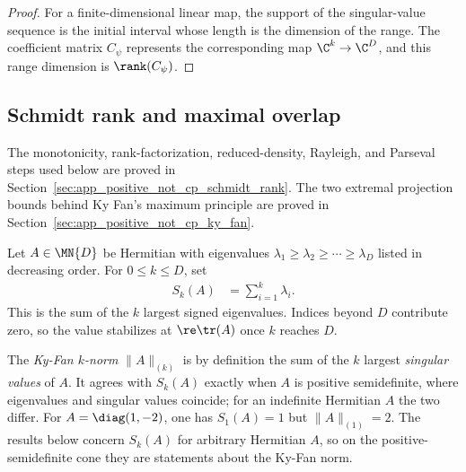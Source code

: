 \begin{proof}
    \leanok
    For a finite-dimensional linear map, the support of the singular-value
    sequence is the initial interval whose length is the dimension of the
    range. The coefficient matrix $C_\psi$ represents the corresponding map
    $\C^k\to\C^D$, and this range dimension is $\rank(C_\psi)$.
\end{proof}

\subsection{Schmidt rank and maximal overlap}

The monotonicity, rank-factorization, reduced-density, Rayleigh, and Parseval
steps used below are proved in
Section~\ref{sec:app_positive_not_cp_schmidt_rank}. The two extremal
projection bounds behind Ky Fan's maximum principle are proved in
Section~\ref{sec:app_positive_not_cp_ky_fan}.


\begin{definition}
    \label{def:ky_fan_norm}
    \leanok
    Let $A\in\MN{D}$ be Hermitian with eigenvalues
    $\lambda_1\ge\lambda_2\ge\cdots\ge\lambda_D$ listed in decreasing order.
    For $0\le k\le D$, set
    \begin{align}
        S_k(A)
         & =\sum_{i=1}^{k}\lambda_i.
        \label{eq:channel_largest_eigenvalue_sum}
    \end{align}
    This is the sum of the $k$ largest signed eigenvalues. Indices beyond $D$
    contribute zero, so the value stabilizes at $\re\tr(A)$ once $k$ reaches
    $D$.

    The \emph{Ky-Fan $k$-norm} $\|A\|_{(k)}$ is by definition the sum of the
    $k$ largest \emph{singular values} of $A$. It agrees with $S_k(A)$ exactly
    when $A$ is positive semidefinite, where eigenvalues and singular values
    coincide; for an indefinite Hermitian $A$ the two differ. For
    $A=\diag(1,-2)$, one has $S_1(A)=1$ but $\|A\|_{(1)}=2$. The results below
    concern $S_k(A)$ for arbitrary Hermitian $A$, so on the
    positive-semidefinite cone they are statements about the Ky-Fan norm.
\end{definition}

